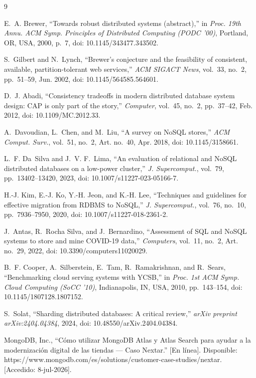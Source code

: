 \documentclass[10pt,journal]{IEEEtran}
\begin{document}
\begin{thebibliography}{9}

E.~A. Brewer, ``Towards robust distributed systems (abstract),'' in \textit{Proc. 19th Annu. ACM Symp. Principles of Distributed Computing (PODC '00)}, Portland, OR, USA, 2000, p.~7, doi: 10.1145/343477.343502.

S.~Gilbert and N.~Lynch, ``Brewer's conjecture and the feasibility of consistent, available, partition-tolerant web services,'' \textit{ACM SIGACT News}, vol.~33, no.~2, pp.~51--59, Jun. 2002, doi: 10.1145/564585.564601.

D.~J. Abadi, ``Consistency tradeoffs in modern distributed database system design: CAP is only part of the story,'' \textit{Computer}, vol.~45, no.~2, pp.~37--42, Feb. 2012, doi: 10.1109/MC.2012.33.

A.~Davoudian, L.~Chen, and M.~Liu, ``A survey on NoSQL stores,'' \textit{ACM Comput. Surv.}, vol.~51, no.~2, Art. no.~40, Apr. 2018, doi: 10.1145/3158661.

L.~F. Da~Silva and J.~V. F.~Lima, ``An evaluation of relational and NoSQL distributed databases on a low-power cluster,'' \textit{J. Supercomput.}, vol.~79, pp.~13402--13420, 2023, doi: 10.1007/s11227-023-05166-7.

H.-J. Kim, E.-J. Ko, Y.-H. Jeon, and K.-H. Lee, ``Techniques and guidelines for effective migration from RDBMS to NoSQL,'' \textit{J. Supercomput.}, vol.~76, no.~10, pp.~7936--7950, 2020, doi: 10.1007/s11227-018-2361-2.

J.~Antas, R.~Rocha Silva, and J.~Bernardino, ``Assessment of SQL and NoSQL systems to store and mine COVID-19 data,'' \textit{Computers}, vol.~11, no.~2, Art. no.~29, 2022, doi: 10.3390/computers11020029.

B.~F. Cooper, A.~Silberstein, E.~Tam, R.~Ramakrishnan, and R.~Sears, ``Benchmarking cloud serving systems with YCSB,'' in \textit{Proc. 1st ACM Symp. Cloud Computing (SoCC '10)}, Indianapolis, IN, USA, 2010, pp.~143--154, doi: 10.1145/1807128.1807152.

S.~Solat, ``Sharding distributed databases: A critical review,'' \textit{arXiv preprint arXiv:2404.04384}, 2024, doi: 10.48550/arXiv.2404.04384.

MongoDB, Inc., ``C\'omo utilizar MongoDB Atlas y Atlas Search para ayudar a la modernizaci\'on digital de las tiendas --- Caso Nextar.'' [En l\'inea]. Disponible: https://www.mongodb.com/es/solutions/customer-case-studies/nextar. [Accedido: 8-jul-2026].

\end{thebibliography}
\end{document}
